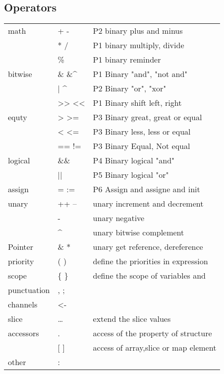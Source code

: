 \documentclass[12pt]{article}
\begin{document}
\subsection{Operators}
\begin{paracol}{2}
\begin{leftcolumn}
\begin{tabular}{lll}
math        & + -       & P2 binary plus and minus \\
            & * /       & P1 binary multiply, divide \\
            & \%        & P1 binary reminder \\
bitwise     & \& \&\^{} & P1 Binary "and", "not and" \\
            & | \^{}    & P2 Binary "or", "xor" \\
            & >> <<     & P1 Binary shift left, right \\
equty       & > >=      & P3 Binary great, great or equal \\
            & < <=      & P3 Binary less, less or equal \\
            & == !=     & P3 Binary Equal, Not equal \\
logical     & \&\&      & P4 Binary logical "and" \\
            & ||        & P5 Binary logical "or" \\
assign      & = :=      & P6 Assign and assigne and init \\
unary       & ++ --     & unary increment and decrement \\
            & -         & unary negative \\
            & \^{}      & unary bitwise complement \\
Pointer     & \& *      & unary get reference, dereference\\
priority    & ( )       & define the priorities in expression \\
scope       & \{ \}     & define the scope of variables and \\
punctuation & , ;       & \\
channels    & <-        & \\
slice       & \ldots    & extend the slice values \\
accessors   & .         & access of the property of structure \\
            & [ ]       & access of array,slice or map element \\
other       & : ~       &  \\
\end{tabular}


\end{leftcolumn}
\end{paracol}
\end{document}
